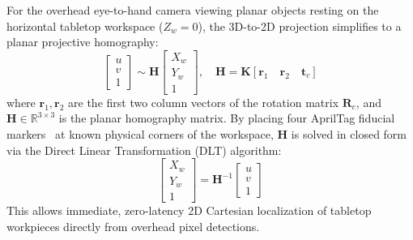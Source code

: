 \documentclass[journal]{IEEEtran}
\begin{document}
For the overhead eye-to-hand camera viewing planar objects resting on the horizontal tabletop workspace ($Z_w = 0$), the 3D-to-2D projection simplifies to a planar projective homography:
\begin{equation}
\begin{bmatrix} u \\ v \\ 1 \end{bmatrix} \sim \mathbf{H} \begin{bmatrix} X_w \\ Y_w \\ 1 \end{bmatrix}, \quad \mathbf{H} = \mathbf{K} \left[ \mathbf{r}_1 \quad \mathbf{r}_2 \quad \mathbf{t}_c \right]
\end{equation}
where $\mathbf{r}_1, \mathbf{r}_2$ are the first two column vectors of the rotation matrix $\mathbf{R}_c$, and $\mathbf{H} \in \mathbb{R}^{3\times3}$ is the planar homography matrix. By placing four AprilTag fiducial markers~\cite{aria_036_olson_2011_apriltag} at known physical corners of the workspace, $\mathbf{H}$ is solved in closed form via the Direct Linear Transformation (DLT) algorithm:
\begin{equation}
\begin{bmatrix} X_w \\ Y_w \\ 1 \end{bmatrix} = \mathbf{H}^{-1} \begin{bmatrix} u \\ v \\ 1 \end{bmatrix}
\end{equation}
This allows immediate, zero-latency 2D Cartesian localization of tabletop workpieces directly from overhead pixel detections.
\end{document}
